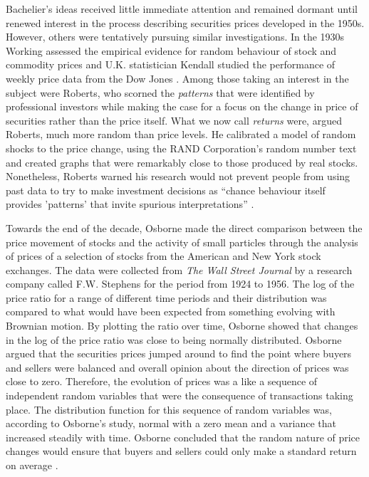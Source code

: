 \documentclass[12pt, a4paper, oneside]{article} %
\begin{document}
Bachelier's ideas received little immediate attention and remained dormant until renewed interest in the process describing securities prices developed in the 1950s.  However, others were tentatively pursuing similar investigations.  In the 1930s Working assessed the empirical evidence for random behaviour of stock and commodity prices \citep{Working1934} and U.K. statistician Kendall studied the performance of weekly price data from the Dow Jones \citep{Kendall1953}.  Among those taking an interest in the subject were Roberts, who scorned the \emph{patterns} that were identified by professional investors while making the case for a focus on the change in price of securities rather than the price itself.  What we now call \emph{returns} were, argued Roberts, much more random than price levels.  He calibrated a model of random shocks to the price change, using the RAND Corporation's random number text \citep{RAND} and created graphs that were remarkably close to those produced by real stocks.  Nonetheless, Roberts warned his research would not prevent people from using past data to try to make investment decisions as ``chance behaviour itself provides 'patterns' that invite spurious interpretations'' \citep[p. 2]{Roberts1959}.  

Towards the end of the decade, Osborne made the direct comparison between the price movement of stocks and the activity of small particles through the analysis of prices of a selection of stocks from the American and New York stock exchanges.  The data were collected from \emph{The Wall Street Journal} by a research company called F.W. Stephens for the period from 1924 to 1956.  The log of the price ratio for a range of different time periods and their distribution was compared to what would have been expected from something evolving with Brownian motion.  By plotting the ratio over time, Osborne showed that changes in the log of the price ratio was close to being normally distributed.  Osborne argued that the securities prices jumped around to find the point where buyers and sellers were balanced and overall opinion about the direction of prices was close to zero. Therefore, the evolution of prices was a like a sequence of independent random variables that were the consequence of transactions taking place.  The distribution function for this sequence of random variables was, according to Osborne's study, normal with a zero mean and a variance that increased steadily with time.  Osborne concluded that the random nature of price changes would ensure that buyers and sellers could only make a standard return on average  \citep{Osborne1959}.  
\end{document}
